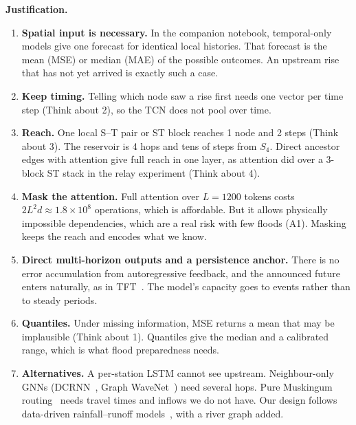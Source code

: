 \documentclass[11pt,a4paper]{article}
\begin{document}
\textbf{Justification.}
\begin{enumerate}[label=\textbf{J\arabic*}, ref=J\arabic*, leftmargin=*]
  \item \textbf{Spatial input is necessary.} In the companion notebook,
  temporal-only models give one forecast for identical local histories. That
  forecast is the mean (MSE) or median (MAE) of the possible outcomes. An
  upstream rise that has not yet arrived is exactly such a case.

  \item \textbf{Keep timing.} Telling which node saw a rise first needs one
  vector per time step (Think about 2), so the TCN does not pool over time.

  \item \textbf{Reach.} One local S--T pair or ST block reaches 1 node and 2
  steps (Think about 3). The reservoir is 4 hops and tens of steps from $S_4$.
  Direct ancestor edges with attention give full reach in one layer, as
  attention did over a 3-block ST stack in the relay experiment (Think about 4).

  \item \textbf{Mask the attention.} Full attention over $L=1200$ tokens costs
  $2L^2d\approx1.8\times10^8$ operations, which is affordable. But it allows
  physically impossible dependencies, which are a real risk with few floods
  (A1). Masking keeps the reach and encodes what we know.

  \item \textbf{Direct multi-horizon outputs and a persistence anchor.} There is
  no error accumulation from autoregressive feedback, and the announced future
  enters naturally, as in TFT~\cite{tft}. The model's capacity goes to events
  rather than to steady periods.

  \item \textbf{Quantiles.} Under missing information, MSE returns a mean that
  may be implausible (Think about 1). Quantiles give the median and a
  calibrated range, which is what flood preparedness needs.

  \item \textbf{Alternatives.} A per-station LSTM cannot see upstream.
  Neighbour-only GNNs (DCRNN~\cite{dcrnn}, Graph WaveNet~\cite{gwn}) need
  several hops. Pure Muskingum routing~\cite{chow} needs travel times and
  inflows we do not have. Our design follows data-driven rainfall--runoff
  models~\cite{kratzert}, with a river graph added.
\end{enumerate}
\end{document}
